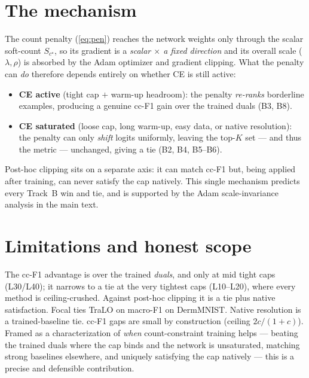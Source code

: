 \documentclass[11pt,a4paper]{article}
\begin{document}
\section{The mechanism}
The count penalty (\ref{eq:pen}) reaches the network weights only through the scalar soft-count $S_{c^\star}$,
so its gradient is a \emph{scalar $\times$ a fixed direction} and its overall scale ($\lambda,\rho$) is absorbed
by the Adam optimizer and gradient clipping. What the penalty can \emph{do} therefore depends entirely on
whether CE is still active:
\begin{itemize}
\item \textbf{CE active} (tight cap $+$ warm-up headroom): the penalty \emph{re-ranks} borderline examples,
producing a genuine cc-F1 gain over the trained duals (B3, B8).
\item \textbf{CE saturated} (loose cap, long warm-up, easy data, or native resolution): the penalty can only
\emph{shift} logits uniformly, leaving the top-$K$ set --- and thus the metric --- unchanged, giving a tie
(B2, B4, B5--B6).
\end{itemize}
Post-hoc clipping sits on a separate axis: it can match cc-F1 but, being applied after training, can never
satisfy the cap natively. This single mechanism predicts every Track~B win and tie, and is supported by the
Adam scale-invariance analysis in the main text.

\section{Limitations and honest scope}
The cc-F1 advantage is over the trained \emph{duals}, and only at mid tight caps (L30/L40); it narrows to a tie
at the very tightest caps (L10--L20), where every method is ceiling-crushed. Against post-hoc clipping it is a
tie plus native satisfaction. Focal ties TraLO on macro-F1 on DermMNIST. Native resolution is a
trained-baseline tie. cc-F1 gaps are small by construction (ceiling $2c/(1+c)$). Framed as a characterization
of \emph{when} count-constraint training helps --- beating the trained duals where the cap binds and the network
is unsaturated, matching strong baselines elsewhere, and uniquely satisfying the cap natively --- this is a
precise and defensible contribution.
\end{document}
